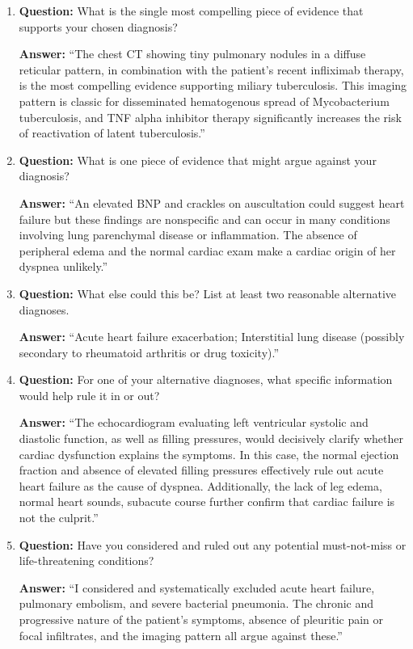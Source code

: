 \begin{enumerate}
  \item \textbf{Question:} What is the single most compelling piece of evidence that supports your chosen diagnosis?

  \textbf{Answer:} ``The chest CT showing tiny pulmonary nodules in a diffuse reticular pattern, in combination with the patient's recent infliximab therapy, is the most compelling evidence supporting miliary tuberculosis. This imaging pattern is classic for disseminated hematogenous spread of Mycobacterium tuberculosis, and TNF alpha inhibitor therapy significantly increases the risk of reactivation of latent tuberculosis.''

  \item \textbf{Question:} What is one piece of evidence that might argue against your diagnosis?

  \textbf{Answer:} ``An elevated BNP and crackles on auscultation could suggest heart failure but these findings are nonspecific and can occur in many conditions involving lung parenchymal disease or inflammation. The absence of peripheral edema and the normal cardiac exam make a cardiac origin of her dyspnea unlikely.''

  \item \textbf{Question:} What else could this be? List at least two reasonable alternative diagnoses.

  \textbf{Answer:} ``Acute heart failure exacerbation; Interstitial lung disease (possibly secondary to rheumatoid arthritis or drug toxicity).''

  \item \textbf{Question:} For one of your alternative diagnoses, what specific information would help rule it in or out?

  \textbf{Answer:} ``The echocardiogram evaluating left ventricular systolic and diastolic function, as well as filling pressures, would decisively clarify whether cardiac dysfunction explains the symptoms. In this case, the normal ejection fraction and absence of elevated filling pressures effectively rule out acute heart failure as the cause of dyspnea. Additionally, the lack of leg edema, normal heart sounds, subacute course further confirm that cardiac failure is not the culprit.''

  \item \textbf{Question:} Have you considered and ruled out any potential must-not-miss or life-threatening conditions?

  \textbf{Answer:} ``I considered and systematically excluded acute heart failure, pulmonary embolism, and severe bacterial pneumonia. The chronic and progressive nature of the patient's symptoms, absence of pleuritic pain or focal infiltrates, and the imaging pattern all argue against these.''
\end{enumerate}

